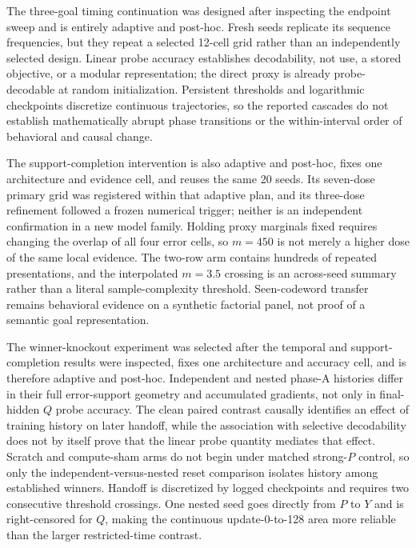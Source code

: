 \documentclass[11pt,a4paper]{article}
\begin{document}
The three-goal timing continuation was designed after inspecting the endpoint sweep and is entirely adaptive and post-hoc. Fresh seeds replicate its sequence frequencies, but they repeat a selected 12-cell grid rather than an independently selected design. Linear probe accuracy establishes decodability, not use, a stored objective, or a modular representation; the direct proxy is already probe-decodable at random initialization. Persistent thresholds and logarithmic checkpoints discretize continuous trajectories, so the reported cascades do not establish mathematically abrupt phase transitions or the within-interval order of behavioral and causal change.

The support-completion intervention is also adaptive and post-hoc, fixes one architecture and evidence cell, and reuses the same 20 seeds. Its seven-dose primary grid was registered within that adaptive plan, and its three-dose refinement followed a frozen numerical trigger; neither is an independent confirmation in a new model family. Holding proxy marginals fixed requires changing the overlap of all four error cells, so $m=450$ is not merely a higher dose of the same local evidence. The two-row arm contains hundreds of repeated presentations, and the interpolated $m=3.5$ crossing is an across-seed summary rather than a literal sample-complexity threshold. Seen-codeword transfer remains behavioral evidence on a synthetic factorial panel, not proof of a semantic goal representation.

The winner-knockout experiment was selected after the temporal and support-completion results were inspected, fixes one architecture and accuracy cell, and is therefore adaptive and post-hoc. Independent and nested phase-A histories differ in their full error-support geometry and accumulated gradients, not only in final-hidden $Q$ probe accuracy. The clean paired contrast causally identifies an effect of training history on later handoff, while the association with selective decodability does not by itself prove that the linear probe quantity mediates that effect. Scratch and compute-sham arms do not begin under matched strong-$P$ control, so only the independent-versus-nested reset comparison isolates history among established winners. Handoff is discretized by logged checkpoints and requires two consecutive threshold crossings. One nested seed goes directly from $P$ to $Y$ and is right-censored for $Q$, making the continuous update-0-to-128 area more reliable than the larger restricted-time contrast.
\end{document}
